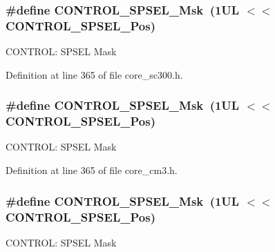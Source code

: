 \subsubsection[{\texorpdfstring{C\+O\+N\+T\+R\+O\+L\+\_\+\+S\+P\+S\+E\+L\+\_\+\+Msk}{CONTROL_SPSEL_Msk}}]{\setlength{\rightskip}{0pt plus 5cm}\#define C\+O\+N\+T\+R\+O\+L\+\_\+\+S\+P\+S\+E\+L\+\_\+\+Msk~(1\+U\+L $<$$<$ C\+O\+N\+T\+R\+O\+L\+\_\+\+S\+P\+S\+E\+L\+\_\+\+Pos)}\hypertarget{group___c_m_s_i_s___c_o_r_e_ga70b29840969b06909da21369b0b05b53}{}\label{group___c_m_s_i_s___c_o_r_e_ga70b29840969b06909da21369b0b05b53}
C\+O\+N\+T\+R\+OL\+: S\+P\+S\+EL Mask 

Definition at line 365 of file core\+\_\+sc300.\+h.

\subsubsection[{\texorpdfstring{C\+O\+N\+T\+R\+O\+L\+\_\+\+S\+P\+S\+E\+L\+\_\+\+Msk}{CONTROL_SPSEL_Msk}}]{\setlength{\rightskip}{0pt plus 5cm}\#define C\+O\+N\+T\+R\+O\+L\+\_\+\+S\+P\+S\+E\+L\+\_\+\+Msk~(1\+U\+L $<$$<$ C\+O\+N\+T\+R\+O\+L\+\_\+\+S\+P\+S\+E\+L\+\_\+\+Pos)}\hypertarget{group___c_m_s_i_s___c_o_r_e_ga70b29840969b06909da21369b0b05b53}{}\label{group___c_m_s_i_s___c_o_r_e_ga70b29840969b06909da21369b0b05b53}
C\+O\+N\+T\+R\+OL\+: S\+P\+S\+EL Mask 

Definition at line 365 of file core\+\_\+cm3.\+h.

\subsubsection[{\texorpdfstring{C\+O\+N\+T\+R\+O\+L\+\_\+\+S\+P\+S\+E\+L\+\_\+\+Msk}{CONTROL_SPSEL_Msk}}]{\setlength{\rightskip}{0pt plus 5cm}\#define C\+O\+N\+T\+R\+O\+L\+\_\+\+S\+P\+S\+E\+L\+\_\+\+Msk~(1\+U\+L $<$$<$ C\+O\+N\+T\+R\+O\+L\+\_\+\+S\+P\+S\+E\+L\+\_\+\+Pos)}\hypertarget{group___c_m_s_i_s___c_o_r_e_ga70b29840969b06909da21369b0b05b53}{}\label{group___c_m_s_i_s___c_o_r_e_ga70b29840969b06909da21369b0b05b53}
C\+O\+N\+T\+R\+OL\+: S\+P\+S\+EL Mask 

